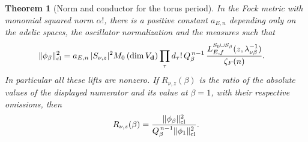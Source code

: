 \documentclass[a4paper,11pt]{article}
\newtheorem{theorem}[proposition]{Theorem}
\theoremstyle{definition}
\theoremstyle{remark}
\numberwithin{equation}{section}
\begin{document}
\begin{theorem}[Norm and conductor for the torus period]
\leavevmode\label{thm:torusnorm852}
In the Fock metric with monomial squared norm \(\alpha!\), there
is a positive constant \(a_{E,n}\) depending only on the adelic
spaces, the oscillator normalization and the measures such that
\[
\begin{split}
 \|\phi_\beta\|_{\rm cl}^2
   ={}&a_{E,n}\,|S_{\nu,z}|^2 M_0\,
       (\dim V_{\mathbf d})\prod_{\tau}d_\tau!\,
       Q_\beta^{\,n-1}\,
       \frac{L_{E,f}^{S_0\cup S_\beta}
                        (z,\lambda_{\nu\beta}^{-1})}{\zeta_F(n)} .
\end{split}
\]
In particular all these lifts are nonzero. If \(R_{\nu,z}(\beta)\)
is the ratio of the absolute values of the displayed numerator
and its value at \(\beta=1\), with their respective omissions,
then
\[
       R_{\nu,z}(\beta)
           =\frac{\|\phi_\beta\|_{\rm cl}^2}
                   {Q_\beta^{\,n-1}\|\phi_1\|_{\rm cl}^2}.
\]
\end{theorem}
\end{document}
